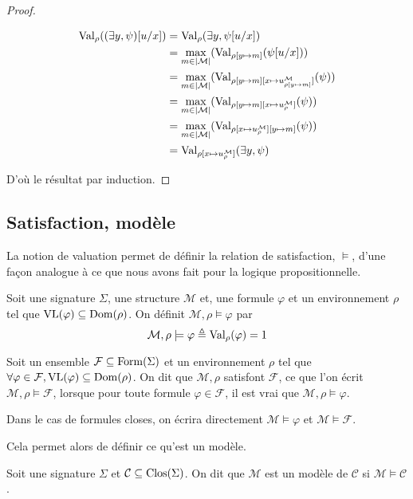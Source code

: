 \begin{proof}
\begin{itemize}
\begin{align*}
      \operatorname{Val}_\rho((\exists y,\psi)[u/x]) &= \operatorname{Val}_\rho(\exists y,\psi[u/x])\\
      &= \max_{m\in|\mathcal M|}(\operatorname{Val}_{\rho[y \mapsto m]}(\psi[u/x]))\\
      &= \max_{m\in|\mathcal M|}(\operatorname{Val}_{\rho[y\mapsto m]
        [x\mapsto u^\mathcal M_{\rho[y\mapsto m]}]}(\psi))\\
      &= \max_{m\in|\mathcal M|}(\operatorname{Val}_{\rho[y\mapsto m][x\mapsto u^\mathcal M_\rho]}(\psi))\\
      &= \max_{m\in|\mathcal M|}(\operatorname{Val}_{\rho[x\mapsto u^\mathcal M_\rho][y\mapsto m]}(\psi))\\
      &= \operatorname{Val}_{\rho[x\mapsto u^\mathcal M_\rho]}(\exists y, \psi)
    \end{align*}
  \end{itemize}
  D'où le résultat par induction.
\end{proof}

\subsection{Satisfaction, modèle}

La notion de valuation permet de définir la relation de satisfaction, $\models$,
d'une façon analogue à ce que nous avons fait pour la logique propositionnelle.

\begin{definition}[Satisfaction]
  Soit une signature $\Sigma$, une structure $\mathcal M$ et, une formule
  $\varphi$ et un environnement $\rho$ tel que $\operatorname{VL}(\varphi)\subseteq\operatorname{Dom}(\rho)$.
  On définit $\mathcal M,\rho\models \varphi$ par
  \[\mathcal M,\rho\models \varphi \triangleq \operatorname{Val}_\rho(\varphi) = 1\]

  Soit un ensemble $\mathcal F\subseteq\operatorname{Form}(\Sigma)$ et un environnement
  $\rho$ tel que $\forall \varphi\in\mathcal F, \operatorname{VL}(\varphi)\subseteq\operatorname{Dom}(\rho)$.
  On dit que $\mathcal M,\rho$ satisfont $\mathcal F$, ce que l'on écrit
  $\mathcal M,\rho\models\mathcal F$, lorsque pour toute formule
  $\varphi\in\mathcal F$, il est vrai que $\mathcal M,\rho\models \varphi$.

  Dans le cas de formules closes, on écrira directement
  $\mathcal M\models\varphi$ et $\mathcal M\models \mathcal F$.
\end{definition}

Cela permet alors de définir ce qu'est un modèle.

\begin{definition}[Modèle]
  Soit une signature $\Sigma$ et $\mathcal C\subseteq\operatorname{Clos}(\Sigma)$. On dit que
  $\mathcal M$ est un modèle de $\mathcal C$ si $\mathcal M\models \mathcal C$.
\end{definition}

